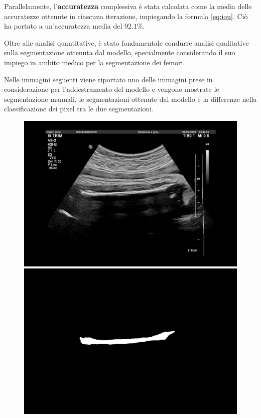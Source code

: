Parallelamente, l'\textbf{accuratezza} complessiva è stata calcolata come la media delle accuratezze
ottenute in ciascuna iterazione, impiegando la formula \ref{eq:iou}. Ciò ha portato a un'accuratezza
media del \textbf{$92.1\%$}.

Oltre alle analisi quantitative, è stato fondamentale condurre analisi qualitative sulla
segmentazione ottenuta dal modello, specialmente considerando il suo impiego in ambito medico per la
segmentazione dei femori.

Nelle immagini seguenti viene riportato uno delle immagini prese in considerazione per
l'addestramento del modello e vengono mostrate le segmentazione manuali, le segmentazioni ottenute
dal modello e la differenze nella classificazione dei pixel tra le due segmentazioni.


\begin{figure}[!ht]
	\centering
	\begin{minipage}{0.32\textwidth}
		\centering
		\includegraphics[width=\linewidth]{Immagini/image.png}
	\end{minipage}
	\hfill %
	\begin{minipage}{0.32\textwidth}
		\centering
		\includegraphics[width=\linewidth]{Immagini/mask.png}

\end{minipage}
\end{figure}
